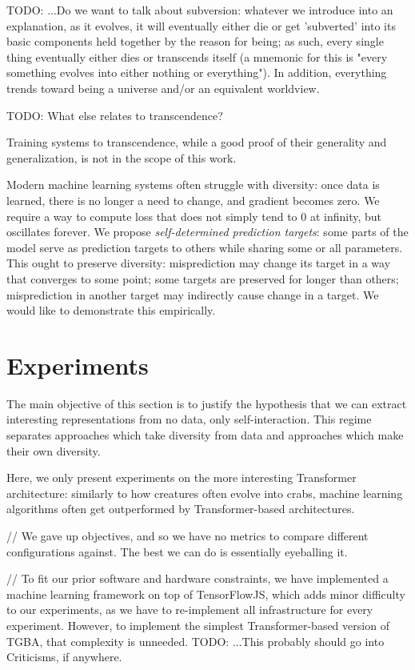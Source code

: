 \documentclass{article}
\begin{document}
    TODO: ...Do we want to talk about subversion: whatever we introduce into an explanation, as it evolves, it will eventually either die or get 'subverted' into its basic components held together by the reason for being; as such, every single thing eventually either dies or transcends itself (a mnemonic for this is "every something evolves into either nothing or everything"). In addition, everything trends toward being a universe and/or an equivalent worldview.

    TODO: What else relates to transcendence?

Training systems to transcendence, while a good proof of their generality and generalization, is not in the scope of this work.

Modern machine learning systems often struggle with diversity: once data is learned, there is no longer a need to change, and gradient becomes zero. We require a way to compute loss that does not simply tend to $0$ at infinity, but oscillates forever. We propose \textit{self-determined prediction targets}: some parts of the model serve as prediction targets to others while sharing some or all parameters. This ought to preserve diversity: misprediction may change its target in a way that converges to some point; some targets are preserved for longer than others; misprediction in another target may indirectly cause change in a target. We would like to demonstrate this empirically.

\section{Experiments}

The main objective of this section is to justify the hypothesis that we can extract interesting representations from no data, only self-interaction. This regime separates approaches which take diversity from data and approaches which make their own diversity.

Here, we only present experiments on the more interesting Transformer architecture: similarly to how creatures often evolve into crabs, machine learning algorithms often get outperformed by Transformer-based architectures.

// We gave up objectives, and so we have no metrics to compare different configurations against. The best we can do is essentially eyeballing it.

// To fit our prior software and hardware constraints, we have implemented a machine learning framework on top of TensorFlowJS, which adds minor difficulty to our experiments, as we have to re-implement all infrastructure for every experiment. However, to implement the simplest Transformer-based version of TGBA, that complexity is unneeded. TODO: ...This probably should go into Criticisms, if anywhere.
\end{document}
